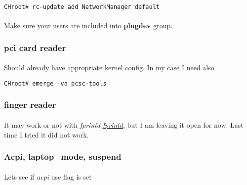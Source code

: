 \documentclass[10pt,a4paper]{article}
\begin{document}
                    \begin{lstlisting}[style=BashInputCHRoot]
 CHroot# rc-update add NetworkManager default
                    \end{lstlisting}

                    \paragraph{} Make sure your users are included into \textbf{plugdev} group.

                \newpage
                \subsubsection{pci card reader}

                    \paragraph{} Should already have appropriate kernel config. In my case I need also

                    \begin{lstlisting}[style=BashInputCHRoot]
 CHroot# emerge -va pcsc-tools
                    \end{lstlisting}

                \newpage
                \subsubsection{finger reader}

                    \paragraph{} It may work or not with \textit{fprintd} \href{https://wiki.gentoo.org/wiki/Fingerprint_Reader}{\textit{fprintd}}, but I am leaving it open for now. Last time I tried it did not work.


                \newpage
                \subsubsection{Acpi, laptop\_mode, suspend}

                    \paragraph{} Lets see if \textit{acpi} use flag is set
\end{document}
